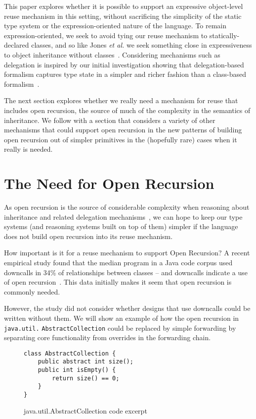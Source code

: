 \documentclass[preprint,10pt]{sigplanconf}
\begin{document}
This paper explores whether it is possible to support an expressive
object-level reuse mechanism in this setting, without sacrificing
the simplicity of the static type system or the expression-oriented
nature of the language.  To remain expression-oriented, we seek to
avoid tying our reuse mechanism to statically-declared classes,
and so like Jones \textit{et al.} we seek something close in
expressiveness to object inheritance without
classes~\cite{jones:2016:inheritance}.
Considering mechanisms such
as delegation is inspired by our initial 
investigation showing that delegation-based formalism captures type state in a simpler and richer fashion than a class-based formalism~\cite{li:2015:ftfjp-typestate}.

The next section explores whether we really need a mechanism for reuse
that includes open recursion, the source of much of the complexity in
the semantics of inheritance.  We follow with a section that considers
a variety of other mechanisms that could support open recursion in the 
new patterns of building open recursion out of simpler primitives in the
(hopefully rare) cases when it really is needed.

\section{The Need for Open Recursion}

As open recursion is the source of considerable complexity when
reasoning about inheritance and related delegation
mechanisms~\cite{li:2015:ftfjp-typestate}, we can hope to keep our
type systems (and reasoning systems built on top of them) simpler if
the language does not build open recursion into its reuse mechanism.

How important is it for a reuse mechanism to support Open Recursion?
A recent empirical study found that the median program
in a Java code corpus used downcalls in 34\% of relationships
between classes -- and downcalls indicate a use of open
recursion~\cite{tempero2013programmers}.
This data initially makes it seem that open recursion is commonly
needed.

However, the study did not consider whether designs that use
downcalls could be written without them.  We will show an example
of how the open recursion in \texttt{java.util.} \texttt{AbstractCollection}
could be replaced by simple forwarding by separating core
functionality from overrides in the forwarding chain.

\begin{figure}
\begin{lstlisting}
class AbstractCollection {
    public abstract int size();
    public int isEmpty() {
        return size() == 0;
    }
}
\end{lstlisting}
\caption{java.util.AbstractCollection code excerpt}
\label{f:abstract-collection}
\end{figure}
\end{document}
